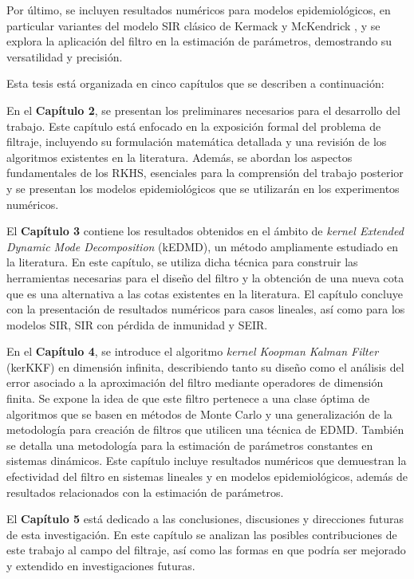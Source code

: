 Por último, se incluyen resultados numéricos para modelos epidemiológicos, en particular variantes del modelo SIR clásico de Kermack y McKendrick \cite{Hethcote1989ThreeModels, Grassly2008MathematicalTransmission}, y se explora la aplicación del filtro en la estimación de parámetros, demostrando su versatilidad y precisión.

Esta tesis está organizada en cinco capítulos que se describen a continuación:

En el \textbf{Capítulo 2}, se presentan los preliminares necesarios para el desarrollo del trabajo. Este capítulo está enfocado en la exposición formal del problema de filtraje, incluyendo su formulación matemática detallada y una revisión de los algoritmos existentes en la literatura. Además, se abordan los aspectos fundamentales de los RKHS, esenciales para la comprensión del trabajo posterior y se presentan los modelos epidemiológicos que se utilizarán en los experimentos numéricos.

El \textbf{Capítulo 3} contiene los resultados obtenidos en el ámbito de \textit{kernel Extended Dynamic Mode Decomposition} (kEDMD), un método ampliamente estudiado en la literatura. En este capítulo, se utiliza dicha técnica para construir las herramientas necesarias para el diseño del filtro y la obtención de una nueva cota que es una alternativa a las cotas existentes en la literatura. El capítulo concluye con la presentación de resultados numéricos para casos lineales, así como para los modelos SIR, SIR con pérdida de inmunidad y SEIR.

En el \textbf{Capítulo 4}, se introduce el algoritmo \textit{kernel Koopman Kalman Filter} (kerKKF) en dimensión infinita, describiendo tanto su diseño como el análisis del error asociado a la aproximación del filtro mediante operadores de dimensión finita. Se expone la idea de que este filtro pertenece a una clase óptima de algoritmos que se basen en métodos de Monte Carlo y una generalización de la metodología para creación de filtros que utilicen una técnica de EDMD. También se detalla una metodología para la estimación de parámetros constantes en sistemas dinámicos. Este capítulo incluye resultados numéricos que demuestran la efectividad del filtro en sistemas lineales y en modelos epidemiológicos, además de resultados relacionados con la estimación de parámetros.

El \textbf{Capítulo 5} está dedicado a las conclusiones, discusiones y direcciones futuras de esta investigación. En este capítulo se analizan las posibles contribuciones de este trabajo al campo del filtraje, así como las formas en que podría ser mejorado y extendido en investigaciones futuras.

